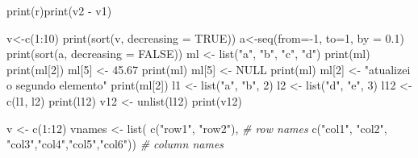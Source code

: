 \documentclass[
]{article}
\newenvironment{Shaded}{\begin{snugshade}}{\end{snugshade}}
\newcommand{\AttributeTok}[1]{\textcolor[rgb]{0.77,0.63,0.00}{#1}}
\newcommand{\CommentTok}[1]{\textcolor[rgb]{0.56,0.35,0.01}{\textit{#1}}}
\newcommand{\ConstantTok}[1]{\textcolor[rgb]{0.00,0.00,0.00}{#1}}
\newcommand{\DecValTok}[1]{\textcolor[rgb]{0.00,0.00,0.81}{#1}}
\newcommand{\FloatTok}[1]{\textcolor[rgb]{0.00,0.00,0.81}{#1}}
\newcommand{\FunctionTok}[1]{\textcolor[rgb]{0.00,0.00,0.00}{#1}}
\newcommand{\NormalTok}[1]{#1}
\newcommand{\OtherTok}[1]{\textcolor[rgb]{0.56,0.35,0.01}{#1}}
\newcommand{\SpecialCharTok}[1]{\textcolor[rgb]{0.00,0.00,0.00}{#1}}
\newcommand{\StringTok}[1]{\textcolor[rgb]{0.31,0.60,0.02}{#1}}
\begin{document}
\begin{Shaded}
\begin{Highlighting}[]
\FunctionTok{print}\NormalTok{(r)}\FunctionTok{print}\NormalTok{(v2 }\SpecialCharTok{{-}}\NormalTok{ v1)}

\NormalTok{v}\OtherTok{\textless{}{-}}\FunctionTok{c}\NormalTok{(}\DecValTok{1}\SpecialCharTok{:}\DecValTok{10}\NormalTok{)}
\FunctionTok{print}\NormalTok{(}\FunctionTok{sort}\NormalTok{(v, }\AttributeTok{decreasing =} \ConstantTok{TRUE}\NormalTok{))}
\NormalTok{a}\OtherTok{\textless{}{-}}\FunctionTok{seq}\NormalTok{(}\AttributeTok{from=}\SpecialCharTok{{-}}\DecValTok{1}\NormalTok{, }\AttributeTok{to=}\DecValTok{1}\NormalTok{, }\AttributeTok{by =} \FloatTok{0.1}\NormalTok{)}
\FunctionTok{print}\NormalTok{(}\FunctionTok{sort}\NormalTok{(a, }\AttributeTok{decreasing =} \ConstantTok{FALSE}\NormalTok{))}
\NormalTok{ml }\OtherTok{\textless{}{-}} \FunctionTok{list}\NormalTok{(}\StringTok{"a"}\NormalTok{, }\StringTok{"b"}\NormalTok{, }\StringTok{"c"}\NormalTok{, }\StringTok{"d"}\NormalTok{)}
\FunctionTok{print}\NormalTok{(ml)}
\FunctionTok{print}\NormalTok{(ml[}\DecValTok{2}\NormalTok{])}
\NormalTok{ml[}\DecValTok{5}\NormalTok{] }\OtherTok{\textless{}{-}} \FloatTok{45.67}
\FunctionTok{print}\NormalTok{(ml)}
\NormalTok{ml[}\DecValTok{5}\NormalTok{] }\OtherTok{\textless{}{-}} \ConstantTok{NULL}
\FunctionTok{print}\NormalTok{(ml)}
\NormalTok{ml[}\DecValTok{2}\NormalTok{] }\OtherTok{\textless{}{-}} \StringTok{"atualizei o segundo elemento"}
\FunctionTok{print}\NormalTok{(ml[}\DecValTok{2}\NormalTok{])}
\NormalTok{l1 }\OtherTok{\textless{}{-}} \FunctionTok{list}\NormalTok{(}\StringTok{"a"}\NormalTok{, }\StringTok{"b"}\NormalTok{, }\DecValTok{2}\NormalTok{)}
\NormalTok{l2 }\OtherTok{\textless{}{-}} \FunctionTok{list}\NormalTok{(}\StringTok{"d"}\NormalTok{, }\StringTok{"e"}\NormalTok{, }\DecValTok{3}\NormalTok{)}
\NormalTok{l12  }\OtherTok{\textless{}{-}} \FunctionTok{c}\NormalTok{(l1, l2)}
\FunctionTok{print}\NormalTok{(l12)}
\NormalTok{v12 }\OtherTok{\textless{}{-}} \FunctionTok{unlist}\NormalTok{(l12)}
\FunctionTok{print}\NormalTok{(v12)}

\NormalTok{v }\OtherTok{\textless{}{-}} \FunctionTok{c}\NormalTok{(}\DecValTok{1}\SpecialCharTok{:}\DecValTok{12}\NormalTok{)}
\NormalTok{vnames }\OtherTok{\textless{}{-}} \FunctionTok{list}\NormalTok{( }
  \FunctionTok{c}\NormalTok{(}\StringTok{"row1"}\NormalTok{, }\StringTok{"row2"}\NormalTok{), }\CommentTok{\# row names}
  \FunctionTok{c}\NormalTok{(}\StringTok{"col1"}\NormalTok{, }\StringTok{"col2"}\NormalTok{, }\StringTok{"col3"}\NormalTok{,}\StringTok{"col4"}\NormalTok{,}\StringTok{"col5"}\NormalTok{,}\StringTok{"col6"}\NormalTok{)) }\CommentTok{\# column names}


\end{Highlighting}
\end{Shaded}
\end{document}
